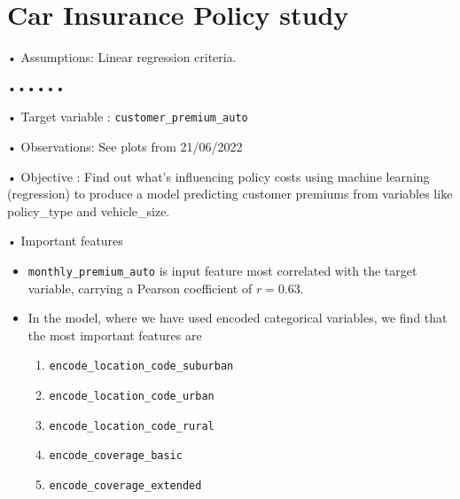 \documentclass[11pt, oneside]{article}   	%
\newcommand{\code}[1]{\colorbox{light-gray}{\texttt{#1}}}
\def\code#1{\texttt{#1}}
\begin{document}
\section{Car Insurance Policy study}
• Assumptions: Linear regression criteria. \newline

••••••

• Target variable : \code{customer\_premium\_auto} \newline
 
• Observations:  See plots from 21/06/2022 \newline

• Objective : Find out what's influencing policy costs using machine learning (regression) to produce a model predicting customer premiums from variables like policy\_type and vehicle\_size.\newline

• Important features 
\begin{itemize}
\item \code{monthly\_premium\_auto} is input feature most correlated with the target variable, carrying a Pearson coefficient of $r=0.63$.  
\item In the model, where we have used encoded categorical variables, we find that the most important features are
\begin{enumerate}
\item \code{encode\_location\_code\_suburban}
\item \code{encode\_location\_code\_urban}
\item \code{encode\_location\_code\_rural}
\item \code{encode\_coverage\_basic}
\item \code{encode\_coverage\_extended}
\end{enumerate}
\end{itemize}
\end{document}
